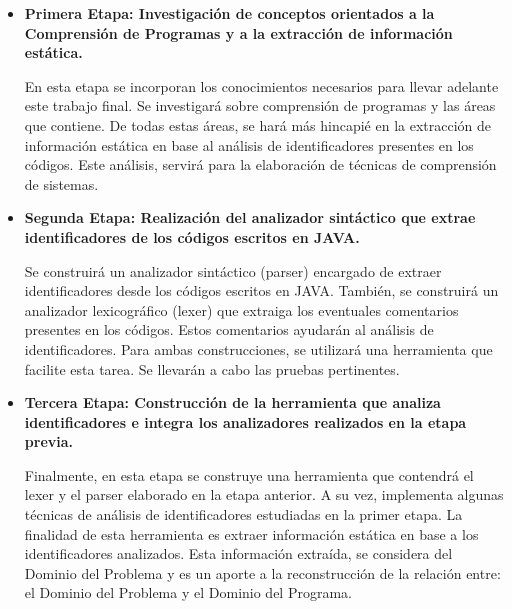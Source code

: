 \documentclass[a4paper,12pt]{report}
\begin{document}
\begin{itemize}
\renewcommand{\labelitemi}{$\circ$}%
\itemsep0em%
\item \textbf{Primera Etapa: Investigación de conceptos orientados a la Comprensión de Programas y a la extracción de información estática.}

\hspace{0.5cm}En esta etapa se incorporan los conocimientos necesarios para llevar adelante este trabajo final. Se investigará sobre comprensión de programas y las áreas que contiene. De todas estas áreas, se hará más hincapié en la extracción de información estática en base al análisis de identificadores presentes en los códigos. Este análisis, servirá para la elaboración de técnicas de comprensión de sistemas.

\pagebreak
\item \textbf{Segunda Etapa: Realización del analizador sintáctico que extrae\\identificadores de los códigos escritos en JAVA.}

\hspace{0.5cm}Se construirá un analizador sintáctico (parser) encargado de extraer identificadores desde los códigos escritos en JAVA. También, se construirá un analizador lexicográfico (lexer) que extraiga los eventuales comentarios presentes en los códigos. Estos comentarios ayudarán al análisis de identificadores. Para ambas construcciones, se utilizará una herramienta que facilite esta tarea. Se llevarán a cabo las pruebas pertinentes.

\vskip0.5cm
\item \textbf{Tercera Etapa: Construcción de la herramienta que analiza\\identificadores e integra los analizadores realizados en la etapa previa.}

\hspace{0.5cm}Finalmente, en esta etapa se construye una herramienta que contendrá el lexer y el parser elaborado en la etapa anterior. A su vez, implementa algunas técnicas de análisis de identificadores estudiadas en la primer etapa. La finalidad de esta herramienta es extraer información estática en base a los identificadores analizados. Esta información extraída, se considera del Dominio del Problema y es un aporte a la reconstrucción de la relación entre: el Dominio del Problema y el Dominio del Programa.

\end{itemize}
\end{document}
